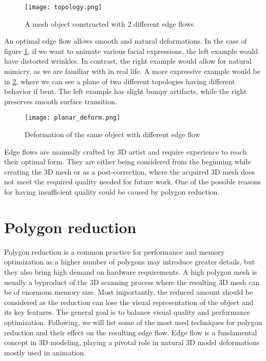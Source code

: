 \begin{figure}[h]
    \centering
    \texttt{[image: topology.png]}
    \caption{A mesh object constructed with 2 different edge flows \cite{decimation}}
    \label{fig:topology_comp}
\end{figure}

An optimal edge flow allows smooth and natural deformations. In the case of figure \ref{fig:topology_comp}, if we want to animate various facial expressions, the left example would have distorted wrinkles. In contrast, the right example would allow for natural mimicry, as we are familiar with in real life. A more expressive example would be in \ref{fig:planar_def}, where we can see a plane of two different topologies having different behavior if bent. The left example has slight bumpy artifacts, while the right preserves smooth surface transition.

\begin{figure}[h]
    \centering
    \texttt{[image: planar\_deform.png]}
    \caption{Deformation of the same object with different edge flow \cite{topology_animation}}
    \label{fig:planar_def}
\end{figure}

Edge flows are manually crafted by 3D artist and require experience to reach their optimal form. They are either being considered from the beginning while creating the 3D mesh or as a post-correction, where the acquired 3D mesh does not meet the required quality needed for future work. One of the possible reasons for having insufficient quality could be caused by polygon reduction.

\section{Polygon reduction}
Polygon reduction is a common practice for performance and memory optimization as a higher number of polygons may introduce greater details, but they also bring high demand on hardware requirements. A high polygon mesh is usually a byproduct of the 3D scanning process where the resulting 3D mesh can be of enormous memory size. Most importantly, the reduced amount should be considered as the reduction can lose the visual representation of the object and its key features. The general goal is to balance visual quality and performance optimization. Following, we will list some of the most used techniques for polygon reduction and their effect on the resulting edge flow. Edge flow is a fundamental concept in 3D modeling, playing a pivotal role in natural 3D model deformations mostly used in animation. 

